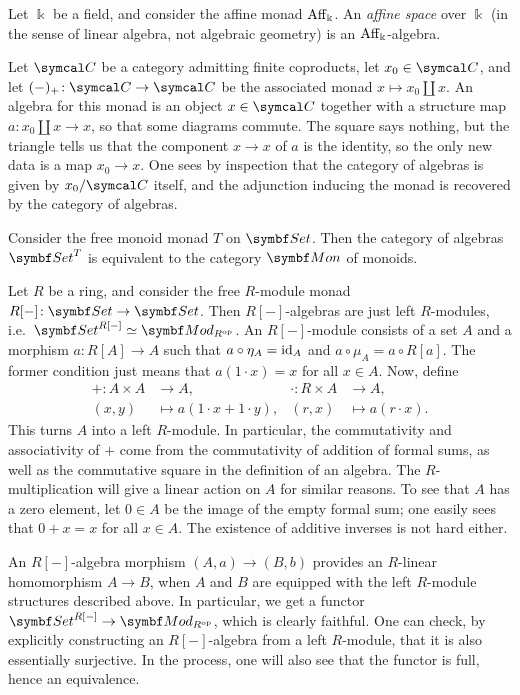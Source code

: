 \begin{example}
	Let \(\Bbbk\) be a field, and consider the affine monad \(\operatorname{Aff}_\Bbbk\). An \emph{affine space} over \(\Bbbk\) (in the sense of linear algebra, not algebraic geometry) is an
	\(\operatorname{Aff}_\Bbbk\)-algebra.
\end{example}
\begin{example}
	Let \(\calC\) be a category admitting finite coproducts, let \(x_0\in\calC\), and let \((-)_+\!:\calC\to\calC\) be the associated monad \(x\mapsto x_0\amalg x\). An algebra
	for this monad is an object \(x\in\calC\) together with a structure map \(a\!:x_0\amalg x \to x\), so that some diagrams commute. The square says nothing, but the triangle tells us that the component
	\(x\to x\) of \(a\) is the identity, so the only new data is a map \(x_0\to x\). One sees by inspection that the category of algebras is given by \(x_0/\calC\) itself,
	and the adjunction inducing the monad is recovered by the category of algebras.
\end{example}
\begin{example}
	Consider the free monoid monad \(T\) on \(\Set\). Then the category of algebras \(\Set^T\) is equivalent to the category \(\Mon\) of monoids.
\end{example}
\begin{example}
	Let \(R\) be a ring, and consider the free \(R\)-module monad \(R[-]\!:\Set\to\Set\). Then \(R[-]\)-algebras are just left \(R\)-modules, i.e.\ \(\Set^{R[-]}\simeq\Mod_{R^\op}\). An \(R[-]\)-module
	consists of a set \(A\) and a morphism \(a\!:R[A]\to A\) such that \(a\circ\eta_A = \mathrm{id}_A\) and \(a\circ\mu_A = a\circ R[a]\). The former condition just means that \(a(1\cdot x) = x\) for all \(x\in A\).
	Now, define
	\begin{align*}
		+\!:A\times A &\to A, & \cdot\!:R\times A&\to A, \\
		(x,y) &\mapsto a(1\cdot x+1\cdot y), & (r,x) &\mapsto a(r\cdot x).
	\end{align*}
	This turns \(A\) into a left \(R\)-module. In particular, the commutativity and associativity of \(+\) come from the commutativity of addition of formal sums, as well as the commutative square in the definition
	of an algebra. The \(R\)-multiplication will give a linear action on \(A\) for similar reasons. To see that \(A\) has a zero element, let \(0\in A\) be the image of the empty formal sum; one
	easily sees that \(0+x = x\) for all \(x\in A\). The existence of additive inverses is not hard either.

	An \(R[-]\)-algebra morphism \((A,a)\to (B,b)\) provides an \(R\)-linear homomorphism \(A\to B\), when \(A\) and \(B\) are equipped with the left \(R\)-module structures described above. In
	particular, we get a functor \(\Set^{R[-]}\to\Mod_{R^\op}\), which is clearly faithful. One can check, by explicitly constructing an \(R[-]\)-algebra from a left \(R\)-module, that it is also essentially surjective.
	In the process, one will also see that the functor is full, hence an equivalence.
\end{example}
